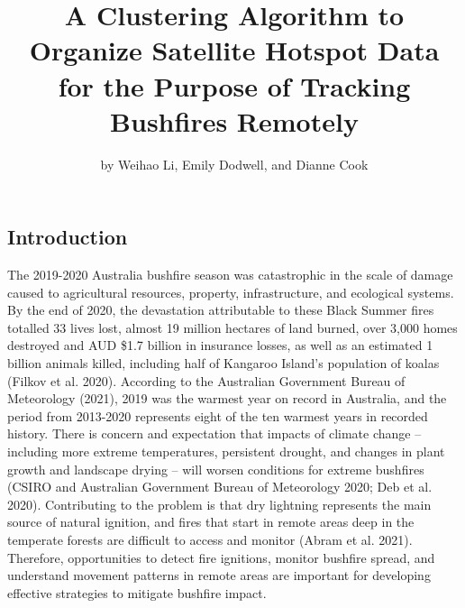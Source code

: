 \title{A Clustering Algorithm to Organize Satellite Hotspot Data for the Purpose of Tracking Bushfires Remotely}


\author{by Weihao Li, Emily Dodwell, and Dianne Cook}

\maketitle


\hypertarget{introduction}{%
\subsection{Introduction}\label{introduction}}

The 2019-2020 Australia bushfire season was catastrophic in the scale of damage caused to agricultural resources, property, infrastructure, and ecological systems. By the end of 2020, the devastation attributable to these Black Summer fires totalled 33 lives lost, almost 19 million hectares of land burned, over 3,000 homes destroyed and AUD \$1.7 billion in insurance losses, as well as an estimated 1 billion animals killed, including half of Kangaroo Island's population of koalas (Filkov et al. 2020). According to the Australian Government Bureau of Meteorology (2021), 2019 was the warmest year on record in Australia, and the period from 2013-2020 represents eight of the ten warmest years in recorded history. There is concern and expectation that impacts of climate change -- including more extreme temperatures, persistent drought, and changes in plant growth and landscape drying -- will worsen conditions for extreme bushfires (CSIRO and Australian Government Bureau of Meteorology 2020; Deb et al. 2020). Contributing to the problem is that dry lightning represents the main source of natural ignition, and fires that start in remote areas deep in the temperate forests are difficult to access and monitor (Abram et al. 2021). Therefore, opportunities to detect fire ignitions, monitor bushfire spread, and understand movement patterns in remote areas are important for developing effective strategies to mitigate bushfire impact.

